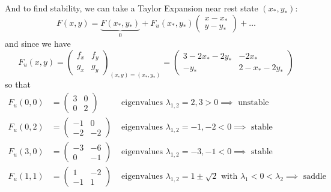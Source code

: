 \documentclass[12pt]{report}
\begin{document}
And to find stability, we can take a Taylor Expansion near rest state $(x_*, y_*)$:
\[F(x, y) = \underbrace{F(x_*, y_*)}_{0} + F_u(x_*, y_*) \begin{pmatrix}
        x - x_* \\ y - y_*
    \end{pmatrix} + \dots\]
and since we have
\[F_u(x, y) = \begin{pmatrix}
        f_x & f_y \\
        g_x & g_y
    \end{pmatrix}_{(x, y) = (x_*, y_*)} = \begin{pmatrix}
        3 - 2x_* - 2y_* & -2x_*          \\
        -y_*            & 2 - x_* - 2y_*
    \end{pmatrix}\]
so that
\begin{align*}
    F_u(0, 0) & = \begin{pmatrix}
                      3 & 0 \\
                      0 & 2
                  \end{pmatrix} & \text{ eigenvalues } \lambda_{1, 2} = 2, 3 > 0 \implies \text{ unstable}                                             \\
    F_u(0, 2) & = \begin{pmatrix}
                      -1 & 0  \\
                      -2 & -2
                  \end{pmatrix} & \text{ eigenvalues } \lambda_{1, 2} = -1, -2 < 0 \implies \text{ stable}                                             \\
    F_u(3, 0) & = \begin{pmatrix}
                      -3 & -6 \\
                      0  & -1
                  \end{pmatrix} & \text{ eigenvalues } \lambda_{1, 2} = -3, -1 < 0 \implies \text{ stable}                                             \\
    F_u(1, 1) & = \begin{pmatrix}
                      1  & -2 \\
                      -1 & 1
                  \end{pmatrix} & \text{ eigenvalues } \lambda_{1, 2} = 1 \pm \sqrt{2} \text{ with } \lambda_1 < 0 < \lambda_2 \implies \text{ saddle}
\end{align*}
\end{document}
